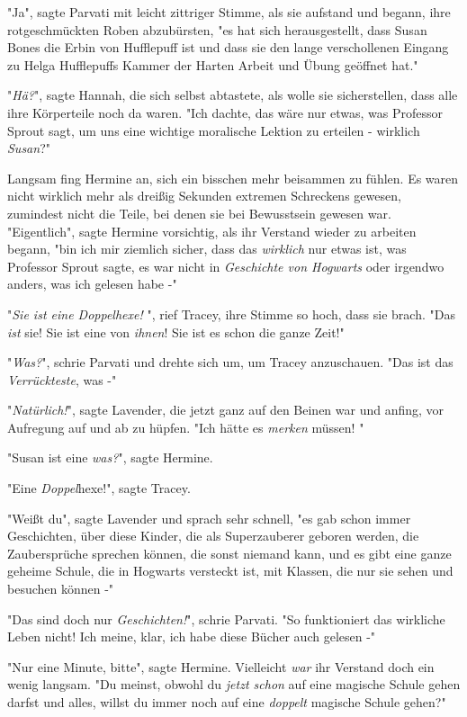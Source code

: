 {"Ja", sagte Parvati mit leicht zittriger Stimme, als sie aufstand und begann, ihre rotgeschmückten Roben abzubürsten, "es hat sich herausgestellt, dass Susan Bones die Erbin von Hufflepuff ist und dass sie den lange verschollenen Eingang zu Helga Hufflepuffs Kammer der Harten Arbeit und Übung geöffnet hat."

"\emph{Hä?}", sagte Hannah, die sich selbst abtastete, als wolle sie sicherstellen, dass alle ihre Körperteile noch da waren. "Ich dachte, das wäre nur etwas, was Professor Sprout sagt, um uns eine wichtige moralische Lektion zu erteilen - wirklich \emph{Susan}?"

Langsam fing Hermine an, sich ein bisschen mehr beisammen zu fühlen. Es waren nicht wirklich mehr als dreißig Sekunden extremen Schreckens gewesen, zumindest nicht die Teile, bei denen sie bei Bewusstsein gewesen war. "Eigentlich", sagte Hermine vorsichtig, als ihr Verstand wieder zu arbeiten begann, "bin ich mir ziemlich sicher, dass das \emph{wirklich} nur etwas ist, was Professor Sprout sagte, es war nicht in \emph{Geschichte von Hogwarts} oder irgendwo anders, was ich gelesen habe -"

"\emph{Sie ist eine Doppelhexe!} ", rief Tracey, ihre Stimme so hoch, dass sie brach. "Das \emph{ist} sie! Sie ist eine von \emph{ihnen}! Sie ist es schon die ganze Zeit!"

"\emph{Was?}", schrie Parvati und drehte sich um, um Tracey anzuschauen. "Das ist das \emph{Verrückteste}, was -"

"\emph{Natürlich!}", sagte Lavender, die jetzt ganz auf den Beinen war und anfing, vor Aufregung auf und ab zu hüpfen. "Ich hätte es \emph{merken} müssen! "

"Susan ist eine \emph{was?}", sagte Hermine.

"Eine \emph{Doppel}hexe!", sagte Tracey.

"Weißt du", sagte Lavender und sprach sehr schnell, "es gab schon immer Geschichten, über diese Kinder, die als Superzauberer geboren werden, die Zaubersprüche sprechen können, die sonst niemand kann, und es gibt eine ganze geheime Schule, die in Hogwarts versteckt ist, mit Klassen, die nur sie sehen und besuchen können -"

"Das sind doch nur \emph{Geschichten!}", schrie Parvati. "So funktioniert das wirkliche Leben nicht! Ich meine, klar, ich habe diese Bücher auch gelesen -"

"Nur eine Minute, bitte", sagte Hermine. Vielleicht \emph{war} ihr Verstand doch ein wenig langsam. "Du meinst, obwohl du \emph{jetzt schon} auf eine magische Schule gehen darfst und alles, willst du immer noch auf eine \emph{doppelt} magische Schule gehen?"

}

